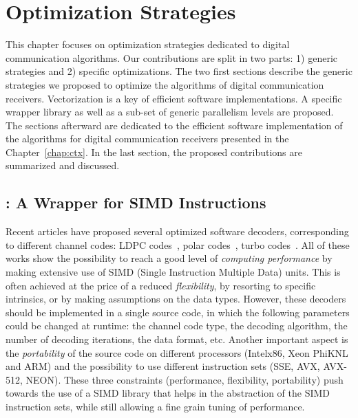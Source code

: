
\renewcommand{\curChapter}{main/chapter2}

\chapter{Optimization Strategies}
\label{chap:opt}

This chapter focuses on optimization strategies dedicated to digital
communication algorithms. Our contributions are split in two parts: 1) generic
strategies and 2) specific optimizations. The two first sections describe the
generic strategies we proposed to optimize the algorithms of digital
communication receivers. Vectorization is a key of efficient software
implementations. A specific wrapper library as well as a sub-set of generic
parallelism levels are proposed. The sections afterward are dedicated to the
efficient software implementation of the algorithms for digital communication
receivers presented in the Chapter~\ref{chap:ctx}. In the last section, the
proposed contributions are summarized and discussed.

\vspace*{\fill}
\minitoccustom
\vspace*{\fill}

\newpage
\section{\MIPP: A \Cxx Wrapper for SIMD Instructions}
\label{sec:opt_mipp}

Recent articles have proposed several optimized software decoders, corresponding
to different channel codes: LDPC codes~\cite{LeGal2015,LeGal2016,LeGal2017a},
polar codes~\cite{Giard2016b,Sarkis2016,Cassagne2015c,Cassagne2016b,
Leonardon2019}, turbo codes~\cite{Zhang2012,Wu2013,Cassagne2016a,LeGal2019a}.
All of these works show the possibility to reach a good level of
\textit{computing performance} by making extensive use of SIMD (Single
Instruction Multiple Data) units. This is often achieved at the price of a
reduced \textit{flexibility}, by resorting to specific intrinsics, or by making
assumptions on the data types. However, these decoders should be implemented in
a single source code, in which the following parameters could be changed at
runtime: the channel code type, the decoding algorithm, the number of decoding
iterations, the data format, etc. Another important aspect is the
\textit{portability} of the source code on different processors (Intel\R x86,
Xeon Phi\TM KNL and ARM\R) and the possibility to use different instruction sets
(SSE, AVX, AVX-512, NEON). These three constraints (performance, flexibility,
portability) push towards the use of a SIMD library that helps in the
abstraction of the SIMD instruction sets, while still allowing a fine grain
tuning of performance.

